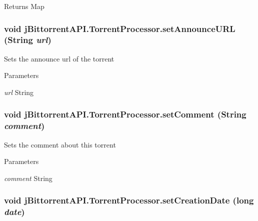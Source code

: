 \begin{DoxyReturn}{Returns}
Map 
\end{DoxyReturn}
\hypertarget{classj_bittorrent_a_p_i_1_1_torrent_processor_ae82dee4118c2689233ae179bad8b059f}{
\subsubsection[{setAnnounceURL}]{\setlength{\rightskip}{0pt plus 5cm}void jBittorrentAPI.TorrentProcessor.setAnnounceURL (String {\em url})}}
\label{classj_bittorrent_a_p_i_1_1_torrent_processor_ae82dee4118c2689233ae179bad8b059f}
Sets the announce url of the torrent 
\begin{DoxyParams}{Parameters}
\item[{\em url}]String \end{DoxyParams}
\hypertarget{classj_bittorrent_a_p_i_1_1_torrent_processor_a4edbf4d4b0b02b69f8f98e7e548a7cd9}{
\subsubsection[{setComment}]{\setlength{\rightskip}{0pt plus 5cm}void jBittorrentAPI.TorrentProcessor.setComment (String {\em comment})}}
\label{classj_bittorrent_a_p_i_1_1_torrent_processor_a4edbf4d4b0b02b69f8f98e7e548a7cd9}
Sets the comment about this torrent 
\begin{DoxyParams}{Parameters}
\item[{\em comment}]String \end{DoxyParams}
\hypertarget{classj_bittorrent_a_p_i_1_1_torrent_processor_a0af2c41df6d24d10b36ef131f2ddf6ba}{
\subsubsection[{setCreationDate}]{\setlength{\rightskip}{0pt plus 5cm}void jBittorrentAPI.TorrentProcessor.setCreationDate (long {\em date})}}
\label{classj_bittorrent_a_p_i_1_1_torrent_processor_a0af2c41df6d24d10b36ef131f2ddf6ba}
